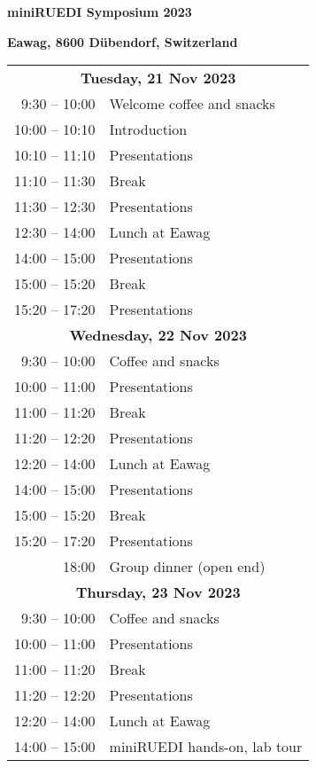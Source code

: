 \documentclass[12pt]{extbook}
\begin{document}
\thispagestyle{empty}
\begin{center}

{\LARGE \bf miniRUEDI Symposium 2023}

\bigskip
\bigskip
\bigskip

{\large \bf Eawag, 8600 Dübendorf, Switzerland}

\bigskip
\bigskip
\bigskip
\bigskip
\bigskip
\bigskip



\begin{tabular}{r@{\hskip 0.5in}l}

\multicolumn{2}{c}{\bf Tuesday, 21 Nov 2023}\\[2ex]
9:30  -- 10:00	&	Welcome coffee and snacks\\
10:00 -- 10:10	&	Introduction\\
10:10 -- 11:10	&	Presentations\\   %
11:10 -- 11:30	&	Break\\
11:30 -- 12:30	& Presentations\\   %
12:30 -- 14:00	&	Lunch at Eawag\\
14:00 -- 15:00	&	Presentations\\   %
15:00 -- 15:20	&	Break\\
15:20 -- 17:20	&	Presentations\\[8ex]   %

\multicolumn{2}{c}{\bf Wednesday, 22 Nov 2023}\\[2ex]
9:30  -- 10:00	&	Coffee and snacks\\
10:00 -- 11:00	&	Presentations\\   %
11:00 -- 11:20	&	Break\\
11:20 -- 12:20	& Presentations\\   %
12:20 -- 14:00	&	Lunch at Eawag\\
14:00 -- 15:00	&	Presentations\\   %
15:00 -- 15:20	&	Break\\
15:20 -- 17:20	&	Presentations\\   %
18:00 \phantom{-- 00:00}	&	Group dinner (open end)\\[8ex]

\multicolumn{2}{c}{\bf Thursday, 23 Nov 2023}\\[2ex]
9:30  -- 10:00	&	Coffee and snacks\\   %
10:00 -- 11:00	&	Presentations\\
11:00 -- 11:20	&	Break\\
11:20 -- 12:20	& Presentations\\       %
12:20 -- 14:00	&	Lunch at Eawag\\
14:00 -- 15:00	&	miniRUEDI hands-on, lab tour\\[1.5ex]

\end{tabular}

\end{center}
\end{document}
